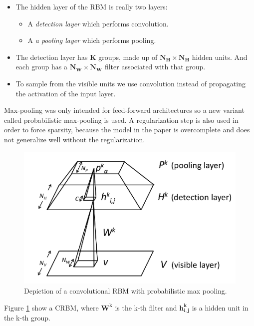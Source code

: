 \documentclass[11pt]{article}
\begin{document}
\begin{itemize}
 \item The hidden layer of the RBM is really two layers:
   \begin{itemize}
           \item A \textit{detection layer} which performs convolution.
            \item A \textit{a pooling layer} which performs pooling.
          \end{itemize}
 \item The detection layer has $\mathbf{K}$ groups, made up of $\mathbf{N_H \times N_H}$ hidden units.  And each group has a $\mathbf{N_W \times N_W}$ filter associated with that group.
 \item To sample from the visible units we use convolution instead of propagating the activation of the input layer.
\end{itemize}

Max-pooling was only intended for feed-forward architectures so a new variant called probabilistic max-pooling is used.  A regularization step is also used in order to force sparsity, because the model in the paper is overcomplete and does not generalize well without the regularization.

\begin{figure}[htb]
  \centering
  \includegraphics[width=\textwidth]{mycdbn.png}
  \caption{Depiction of a convolutional RBM with probabilistic max pooling.}
  \label{fig:crbm}
\end{figure}

\newpage

Figure \ref{fig:crbm} show a CRBM, where $\mathbf{W^k}$ is the k-th filter and $\mathbf{h^k_{i,j}}$ is a hidden unit in the k-th group.
\end{document}

